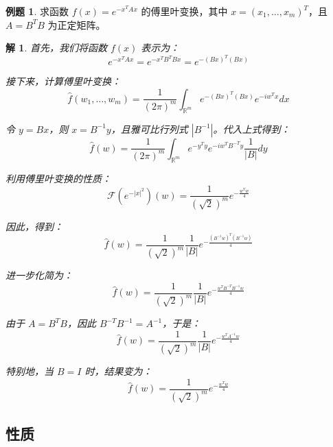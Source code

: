 \documentclass[12pt,a4paper]{article}
\numberwithin{subsection}{section}   %
\numberwithin{subsubsection}{subsection}
\theoremstyle{plain}
\newtheorem{solution}{解}[subsection]  %
\theoremstyle{definition}
\newtheorem{example}{例题}[subsection]  %
\theoremstyle{remark}
\theoremstyle{remark}
\begin{document}
\begin{example}
	求函数 \( f(x) = e^{-x^T A x} \) 的傅里叶变换，其中 \( x = (x_1, \dots, x_m)^T \)，且 \( A = B^T B \) 为正定矩阵。
\end{example}

\begin{solution}
	首先，我们将函数 \( f(x) \) 表示为：
	\begin{equation}
		e^{-x^T A x} = e^{-x^T B^T B x} = e^{-(B x)^T (B x)}
	\end{equation}
	
	接下来，计算傅里叶变换：
	\begin{equation}
		\hat{f}(w_1, \dots, w_m) = \frac{1}{(2\pi)^m} \int_{\mathbb{R}^m} e^{-(B x)^T (B x)} e^{-i w^T x} dx
	\end{equation}
	
	令 \( y = B x \)，则 \( x = B^{-1} y \)，且雅可比行列式 \( |B^{-1}| \)。代入上式得到：
	\begin{equation}
		\hat{f}(w) = \frac{1}{(2\pi)^m} \int_{\mathbb{R}^m} e^{-y^T y} e^{-i w^T B^{-T} y} \frac{1}{|B|} dy
	\end{equation}
	
	利用傅里叶变换的性质：
	\begin{equation}
		\mathcal{F}(e^{-|x|^2})(w) = \frac{1}{(\sqrt{2})^m} e^{-\frac{w^T w}{4}}
	\end{equation}
	
	因此，得到：
	\begin{equation}
		\hat{f}(w) = \frac{1}{(\sqrt{2})^m} \frac{1}{|B|} e^{-\frac{(B^{-1} w)^T (B^{-1} w)}{4}}
	\end{equation}
	
	进一步化简为：
	\begin{equation}
		\hat{f}(w) = \frac{1}{(\sqrt{2})^m} \frac{1}{|B|} e^{-\frac{w^T B^{-T} B^{-1} w}{4}}
	\end{equation}
	
	由于 \( A = B^T B \)，因此 \( B^{-T} B^{-1} = A^{-1} \)，于是：
	\begin{equation}
		\hat{f}(w) = \frac{1}{(\sqrt{2})^m} \frac{1}{|B|} e^{-\frac{w^T A^{-1} w}{4}}
	\end{equation}
	
	特别地，当 \( B = I \) 时，结果变为：
	\begin{equation}
		\hat{f}(w) = \frac{1}{(\sqrt{2})^m} e^{-\frac{w^T w}{4}}
	\end{equation}
\end{solution}

\subsection{性质}
\end{document}
